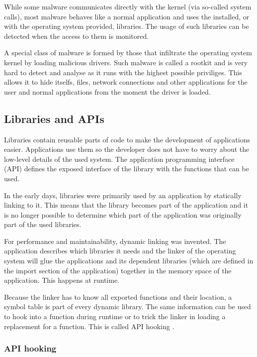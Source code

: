 While some malware communicates directly with the kernel (via so-called system calls), most malware \cite{MaliciousAPIs} behaves like a normal application and uses the installed, or with the operating system provided, libraries. The usage of such libraries can be detected when the access to them is monitored.

A special class of malware \cite{ZeroAccess,Gameover} is formed by those that infiltrate the operating system kernel by loading malicious drivers. Such malware is called a rootkit and is very hard to detect and analyse as it runs with the highest possible priviliges. This allows it to hide itselfs, files, network connections and other applications for the user and normal applications from the moment the driver is loaded.

\subsection{Libraries and APIs}

Libraries contain reusable parts of code to make the development of applications easier. Applications use them so the developer does not have to worry about the low-level details of the used system. The application programming interface (API) defines the exposed interface of the library with the functions that can be used.

In the early days, libraries were primarily used by an application by statically linking to it. This means that the library becomes part of the application and it is no longer possible to determine which part of the application was originally part of the used libraries.

For performance and maintainability, dynamic linking was invented. The application describes which libraries it needs and the linker of the operating system will glue the applications and its dependent libraries (which are defined in the import section of the application) together in the memory space of the application. This happens at runtime. 

Because the linker has to know all exported functions and their location, a symbol table is part of every dynamic library. The same information can be used to hook into a function during runtime or to trick the linker in loading a replacement for a function. This is called API hooking \cite{APIHookingRevealed}.

\subsubsection{API hooking}

